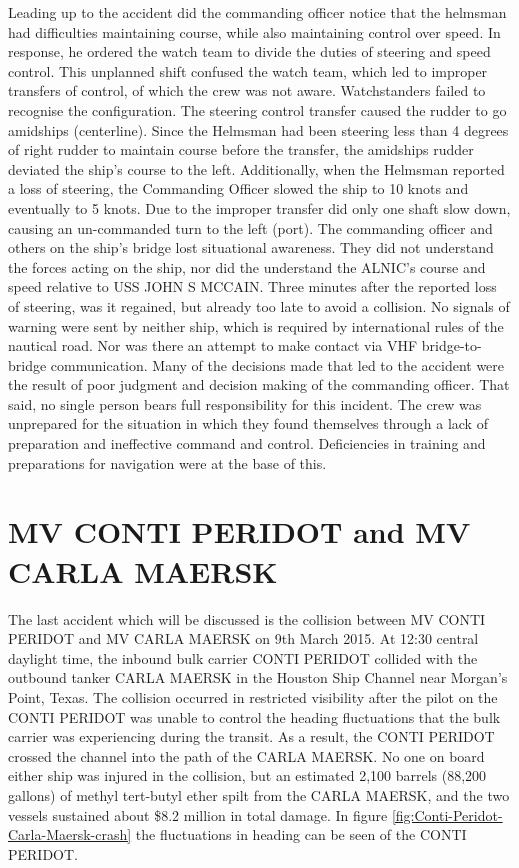 Leading up to the accident did the commanding officer notice that the helmsman had difficulties maintaining course, while also maintaining control over speed. In response, he ordered the watch team to divide the duties of steering and speed control. This unplanned shift confused the watch team, which led to improper transfers of control, of which the crew was not aware. 
Watchstanders failed to recognise the configuration. The steering control transfer caused the rudder to go amidships (centerline). Since the Helmsman had been steering less than 4 degrees of right rudder to maintain course before the transfer, the amidships rudder deviated the ship’s course to the left. Additionally, when the Helmsman reported a loss of steering, the Commanding Officer slowed the ship to 10 knots and eventually to 5 knots. Due to the improper transfer did only one shaft slow down, causing an un-commanded turn to the left (port). The commanding officer and others on the ship's bridge lost situational awareness. They did not understand the forces acting on the ship, nor did the understand the ALNIC's course and speed relative to USS JOHN S MCCAIN. Three minutes after the reported loss of steering, was it regained, but already too late to avoid a collision. No signals of warning were sent by neither ship, which is required by international rules of the nautical road. Nor was there an attempt to make contact via \ac{VHF} bridge-to-bridge communication.
Many of the decisions made that led to the accident were the result of poor judgment and decision making of the commanding officer. That said, no single person bears full responsibility for this incident. The crew was unprepared for the situation in which they found themselves through a lack of preparation and ineffective command and control. Deficiencies in training and preparations for navigation were at the base of this. \cite{USNavy2017}

\newpage
\section{MV CONTI PERIDOT and MV CARLA MAERSK}
The last accident which will be discussed is the collision between MV CONTI PERIDOT and MV CARLA MAERSK on 9th March 2015. At 12:30 central daylight time, the inbound bulk carrier CONTI PERIDOT collided with the outbound tanker CARLA MAERSK in the Houston Ship Channel near Morgan’s Point, Texas. The collision occurred in restricted visibility after the pilot on the CONTI PERIDOT was unable to control the heading fluctuations that the bulk carrier was experiencing during the transit. As a result, the CONTI PERIDOT crossed the channel into the path of the CARLA MAERSK. No one on board either ship was injured in the collision, but an estimated 2,100 barrels (88,200 gallons) of methyl tert-butyl ether spilt from the CARLA MAERSK, and the two vessels sustained about \$8.2 million in total damage. In figure \ref{fig:Conti-Peridot-Carla-Maersk-crash} the fluctuations in heading can be seen of the CONTI PERIDOT. 

